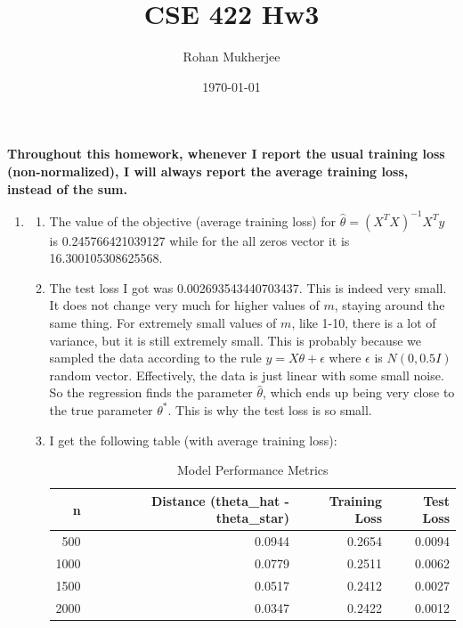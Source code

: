 \documentclass[12pt]{article}
\title{CSE 422 Hw3}
\date{\today}
\author{Rohan Mukherjee}
\theoremstyle{definitionstyle}
\begin{document}
    \maketitle
    \textbf{Throughout this homework, whenever I report the usual training loss (non-normalized), I will always report the average training loss, instead of the sum.}
    \begin{enumerate}[leftmargin=\labelsep]
        \item \begin{enumerate}[label=(\alph*)]
            \item The value of the objective (average training loss) for $\hat \theta = (X^TX)^{-1} X^T y$ is 0.245766421039127 while for the all zeros vector it is 16.300105308625568.
            \item The test loss I got was 0.002693543440703437. This is indeed very small. It does not change very much for higher values of $m$, staying around the same thing. For extremely small values of $m$, like 1-10, there is a lot of variance, but it is still extremely small. This is probably because we sampled the data according to the rule $y = X \theta + \epsilon$ where $\epsilon$ is $N(0, 0.5I)$ random vector. Effectively, the data is just linear with some small noise. So the regression finds the parameter $\hat \theta$, which ends up being very close to the true parameter $\theta^*$. This is why the test loss is so small.
            \item I get the following table (with average training loss):
            \begin{table}
                \centering
                \caption{Model Performance Metrics}
                \label{tab:model_performance}
                \begin{tabular}{rrrr}
                \toprule
                   n &  Distance (theta\_hat - theta\_star) &  Training Loss &  Test Loss \\
                \midrule
                 500 &                             0.0944 &         0.2654 &     0.0094 \\
                1000 &                             0.0779 &         0.2511 &     0.0062 \\
                1500 &                             0.0517 &         0.2412 &     0.0027 \\
                2000 &                             0.0347 &         0.2422 &     0.0012 \\
                \bottomrule
                \end{tabular}

\end{table}
\end{enumerate}
\end{enumerate}
\end{document}
